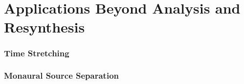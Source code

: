 \chapter{Applications Beyond Analysis and Resynthesis}

\subsection{Time Stretching}

\subsection{Monaural Source Separation}
